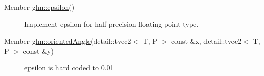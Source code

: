 \label{todo__todo000051}
\hypertarget{todo__todo000051}{}
 \begin{description}
\item[Member \hyperlink{group__gtc__constants_g136c74927d8ab624f3c008bcd8c4445b}{glm::epsilon}() ]Implement epsilon for half-precision floating point type. \end{description}


\label{todo__todo000052}
\hypertarget{todo__todo000052}{}
 \begin{description}
\item[Member \hyperlink{group__gtx__vector__angle_gfd969749b953f7a58da4a2563d06ea36}{glm::orientedAngle}(detail::tvec2$<$ T, P $>$ const \&x, detail::tvec2$<$ T, P $>$ const \&y) ]epsilon is hard coded to 0.01 \end{description}
